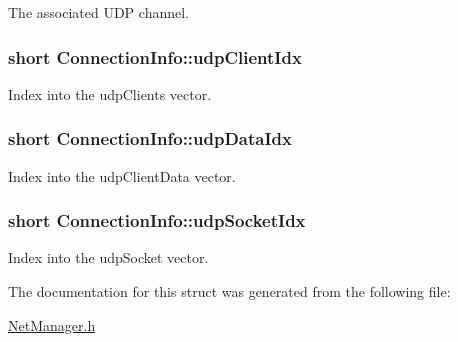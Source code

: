 The associated U\-D\-P channel. 

\hypertarget{structConnectionInfo_a645bd416fa05c5b41ebe4fe06e3b6999}{
\subsubsection[{udp\-Client\-Idx}]{\setlength{\rightskip}{0pt plus 5cm}short Connection\-Info\-::udp\-Client\-Idx}}\label{structConnectionInfo_a645bd416fa05c5b41ebe4fe06e3b6999}


Index into the udp\-Clients vector. 

\hypertarget{structConnectionInfo_a77f71cc46ad9033a81184cae84170277}{
\subsubsection[{udp\-Data\-Idx}]{\setlength{\rightskip}{0pt plus 5cm}short Connection\-Info\-::udp\-Data\-Idx}}\label{structConnectionInfo_a77f71cc46ad9033a81184cae84170277}


Index into the udp\-Client\-Data vector. 

\hypertarget{structConnectionInfo_ac52c36a648203e28b495cea6d7ad29ba}{
\subsubsection[{udp\-Socket\-Idx}]{\setlength{\rightskip}{0pt plus 5cm}short Connection\-Info\-::udp\-Socket\-Idx}}\label{structConnectionInfo_ac52c36a648203e28b495cea6d7ad29ba}


Index into the udp\-Socket vector. 



The documentation for this struct was generated from the following file\-:\begin{DoxyCompactItemize}
\item 
\hyperlink{NetManager_8h}{Net\-Manager.\-h}\end{DoxyCompactItemize}
